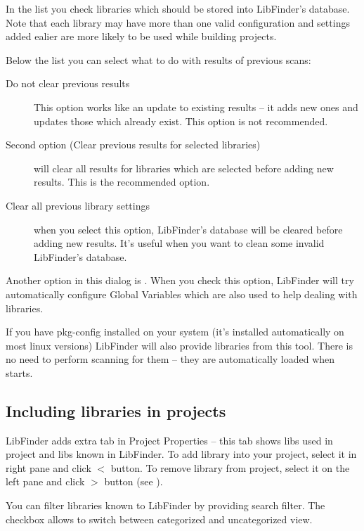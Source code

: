 
In the list you check libraries which should be stored into LibFinder's database. Note that each library may have more than one valid configuration and settings added ealier are more likely to be used while building projects.

Below the list you can select what to do with results of previous scans:

\begin{description}
\item[Do not clear previous results] This option works like an update to existing results -- it adds new ones and updates those which already exist. This option is not recommended.
\item[Second option (Clear previous results for selected libraries)] will clear all results for libraries which are selected before adding new results. This is the recommended option.
\item[Clear all previous library settings] when you select this option, LibFinder's database will be cleared before adding new results. It's useful when you want to clean some invalid LibFinder's database.
\end{description}

Another option in this dialog is . When you check this option, LibFinder will try automatically configure Global Variables which are also used to help dealing with libraries.

If you have pkg-config installed on your system (it's installed automatically on most linux versions) LibFinder will also provide libraries from this tool. There is no need to perform scanning for them -- they are automatically loaded when \codeblocks starts.

\subsection{Including libraries in projects}

LibFinder adds extra tab in Project Properties  -- this tab shows libs used in project and libs known in LibFinder. To add library into your project, select it in right pane and click $<$ button. To remove library from project, select it on the left pane and click $>$ button (see ).


You can filter libraries known to LibFinder by providing search filter. The  checkbox allows to switch between categorized and uncategorized view.

